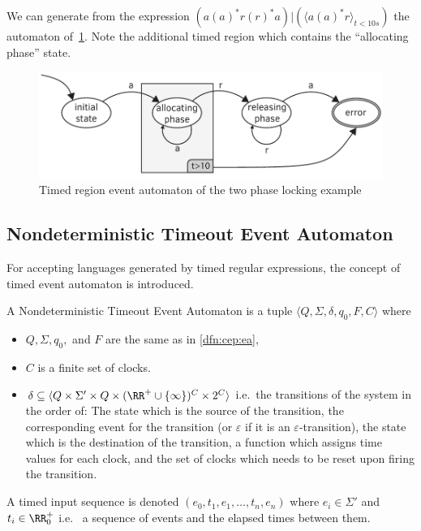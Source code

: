 		
		We can generate from the expression $(a (a)^\ast r (r)^\ast a)|( \langle a (a)^\ast r \rangle_{t < 10 s})$ the automaton of~\cref{fig:cep:trea}. Note the additional timed region which contains the ``allocating phase'' state.
		
		\begin{figure}[h]
			\centering
			\includegraphics[width=0.7\linewidth]{figures/chapter_4/allocating_timed}
			\caption{Timed region event automaton of the two phase locking example \redraw}
			\label{fig:cep:trea}
		\end{figure}
		
		\subsection{Nondeterministic Timeout Event Automaton}
			For accepting languages generated by timed regular expressions, the concept of timed event automaton is introduced.
			
			\begin{dfn}
				\label{dfn:cep:tea}
				A Nondeterministic Timeout Event Automaton is a tuple $\langle Q,\Sigma,\delta,q_0, F, C \rangle$ where
				\begin{itemize}
					\item $Q, \Sigma, q_0,$ and $F$ are the same as in \cref{dfn:cep:ea},	
					\item $C$ is a finite set of clocks.
					\item $\delta \subseteq \langle Q \times \Sigma' \times Q \times (\RR^+ \cup \{\infty\})^C \times 2^C \rangle$ i.e.~the transitions of the system in the order of:
						The state which is the source of the transition,
						the corresponding event for the transition (or $\varepsilon$ if it is an $\varepsilon$-transition),
						the state which is the destination of the transition,
						a function which assigns time values for each clock,
						and the set of clocks which needs to be reset upon firing the transition.
				\end{itemize}
			\end{dfn}
		
			\begin{dfn}
				\label{dfn:cep:tea:inputseq}
				A timed input sequence is denoted $(e_0, t_1, e_1, \dots, t_n, e_n)$ where $e_i \in \Sigma'$ and $t_i \in \RR^+_0$ i.e.~ a sequence of events and the elapsed times between them.
			\end{dfn}
		
